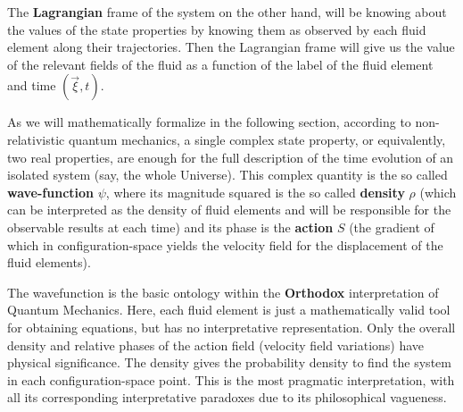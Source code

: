 \documentclass[11pt, a4paper]{article} %
\begin{document}
The {\bf Lagrangian} frame of the system on the other hand, will be knowing about the values of the state properties by knowing them as observed by each fluid element along their trajectories.  Then the Lagrangian frame will give us the value of the relevant fields of the fluid as a function of the label of the fluid element and time $(\vec{\xi},t)$.
 
As we will mathematically formalize in the following section, according to non-relativistic quantum mechanics, a single complex state property, or equivalently, two real properties, are enough for the full description of the time evolution of an isolated system (say, the whole Universe). This complex quantity is the so called {\bf wave-function} $\psi$, where its magnitude squared is the so called {\bf density} $\rho$ (which can be interpreted as the density of fluid elements and will be responsible for the observable results at each time) and its phase is the {\bf action} $S$ (the gradient of which in configuration-space yields the velocity field for the displacement of the fluid elements).

The wavefunction is the basic ontology within the {\bf Orthodox} interpretation of Quantum Mechanics. Here, each fluid element is just a mathematically valid tool for obtaining equations, but has no interpretative representation. Only the overall density and relative phases of the action field (velocity field variations) have physical significance. The density gives the probability density to find the system in each configuration-space point. This is the most pragmatic interpretation, with all its corresponding interpretative paradoxes due to its philosophical vagueness. 
\end{document}
